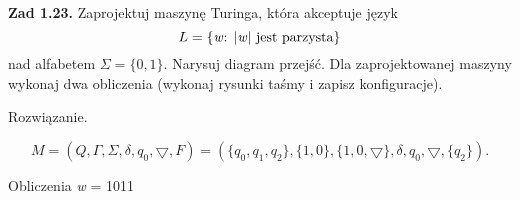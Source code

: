 \documentclass[12pt]{article}
\begin{document}
\newpage

\noindent\textbf{Zad 1.23.} Zaprojektuj maszynę Turinga, która akceptuje język
\[L=\{\text{\textit{w}: |\textit{w}| jest parzysta}\}\]
nad alfabetem $\Sigma=\{0,1\}$. Narysuj diagram przejść. Dla zaprojektowanej maszyny wykonaj dwa obliczenia (wykonaj rysunki taśmy i zapisz konfiguracje).

 Rozwiązanie.
 
\[M=(Q,\Gamma,\Sigma,\delta,q_0,\bigtriangledown,F)=(\{q_0,q_1,q_2\},\{1,0\},\{1,0,\bigtriangledown\},\delta,q_0,\bigtriangledown,\{q_2\}).\]

\vspace{20pt}

\begin{center}
\end{center}

\vspace{20pt}

Obliczenia \textit{w} = 1011
\end{document}
